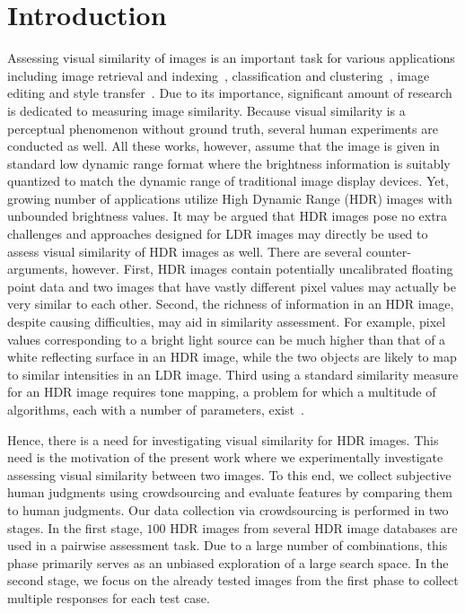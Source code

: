 \chapter{Introduction}
\label{chp:b1}

Assessing visual similarity of images is an important task for various applications including  image retrieval and indexing~\cite{liu2007survey}, classification and clustering~\cite{kleiman2016toward}, image editing and style transfer~\cite{rawat2018find}. Due to its importance, significant amount of research is dedicated to measuring image similarity. Because visual similarity is a perceptual phenomenon without ground truth, several human experiments are conducted as well. All these works, however, assume that the image is given in standard low dynamic range format where the brightness information is suitably quantized to match the dynamic range of traditional image display devices. Yet, growing number  of applications utilize High Dynamic Range (HDR) images with unbounded brightness values. It may be argued that HDR images pose no extra challenges and approaches designed for LDR images may directly be used to assess visual similarity of HDR images as well.  There are several counter-arguments, however. First, HDR images contain potentially uncalibrated floating point data and two images that have vastly different pixel values may actually be very similar to each other. Second, the richness of information in an HDR image, despite causing difficulties, may  aid in similarity assessment. For example, pixel values corresponding to a bright light source can be much higher than that of a white reflecting surface in an HDR image, while the two objects are likely to map to similar intensities in an LDR image. Third using a standard similarity measure for an HDR image requires tone mapping, a problem for which a multitude of algorithms, each with a number of parameters, exist~\cite{yeganeh2012objective}.

Hence, there is a need for investigating visual similarity for HDR images. This need is the motivation of the present work where we experimentally investigate assessing visual similarity between two images. To this end, we collect subjective human judgments using crowdsourcing and evaluate features by comparing them to human judgments. Our data collection via crowdsourcing is performed in two stages.  In the first stage, $100$ HDR images from several HDR image data\-bases are used in a pairwise assessment task. Due to a large number of combinations, this phase primarily serves as an unbiased exploration of a large search space. In the second stage, we focus on the already tested images from the first phase to collect multiple responses for each test case.

